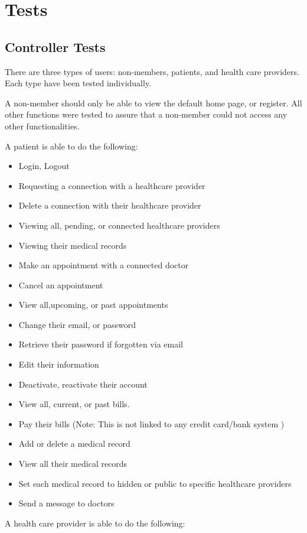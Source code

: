 \documentclass[12pt]{report}
\begin{document}
\section{Tests}

\subsection{Controller Tests}

There are three types of users: non-members, patients, and health care providers. Each type have been tested individually.

A non-member should only be able to view the default home page, or register. All other functions were tested to assure that a non-member could not access any other functionalities. 

A patient is able to do the following:
\begin{itemize}
\item Login, Logout
\item Requesting a connection with a healthcare provider
\item Delete a connection with their healthcare provider
\item Viewing all, pending, or connected healthcare providers
\item Viewing their medical records
\item Make an appointment with a connected doctor
\item Cancel an appointment 
\item View all,upcoming, or past appointments
\item Change their email, or password
\item Retrieve their password if forgotten via email
\item Edit their information
\item Deactivate, reactivate their account
\item View all, current, or past bills.
\item Pay their bills (Note: This is not linked to any credit card/bank system ) 
\item Add or delete a medical record
\item View all their medical records
\item Set each medical record to hidden or public to specific healthcare providers
\item Send a message to doctors
\end{itemize}
A health care provider is able to do the following:
\end{document}
